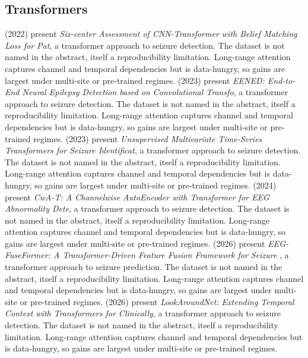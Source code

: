 \subsection{Transformers}
\citet{ep220800025} (2022) present \emph{Six-center Assessment of CNN-Transformer with Belief Matching Loss for Pat}, a transformer approach to seizure detection. The dataset is not named in the abstract, itself a reproducibility limitation. Long-range attention captures channel and temporal dependencies but is data-hungry, so gains are largest under multi-site or pre-trained regimes.
\citet{ep230510502} (2023) present \emph{EENED: End-to-End Neural Epilepsy Detection based on Convolutional Transfo}, a transformer approach to seizure detection. The dataset is not named in the abstract, itself a reproducibility limitation. Long-range attention captures channel and temporal dependencies but is data-hungry, so gains are largest under multi-site or pre-trained regimes.
\citet{ep230103470} (2023) present \emph{Unsupervised Multivariate Time-Series Transformers for Seizure Identificat}, a transformer approach to seizure detection. The dataset is not named in the abstract, itself a reproducibility limitation. Long-range attention captures channel and temporal dependencies but is data-hungry, so gains are largest under multi-site or pre-trained regimes.
\citet{ep241214522} (2024) present \emph{CwA-T: A Channelwise AutoEncoder with Transformer for EEG Abnormality Dete}, a transformer approach to seizure detection. The dataset is not named in the abstract, itself a reproducibility limitation. Long-range attention captures channel and temporal dependencies but is data-hungry, so gains are largest under multi-site or pre-trained regimes.
\citet{ep260602166} (2026) present \emph{EEG-FuseFormer: A Transformer-Driven Feature Fusion Framework for Seizure }, a transformer approach to seizure prediction. The dataset is not named in the abstract, itself a reproducibility limitation. Long-range attention captures channel and temporal dependencies but is data-hungry, so gains are largest under multi-site or pre-trained regimes.
\citet{ep260106016} (2026) present \emph{LookAroundNet: Extending Temporal Context with Transformers for Clinically}, a transformer approach to seizure detection. The dataset is not named in the abstract, itself a reproducibility limitation. Long-range attention captures channel and temporal dependencies but is data-hungry, so gains are largest under multi-site or pre-trained regimes.

